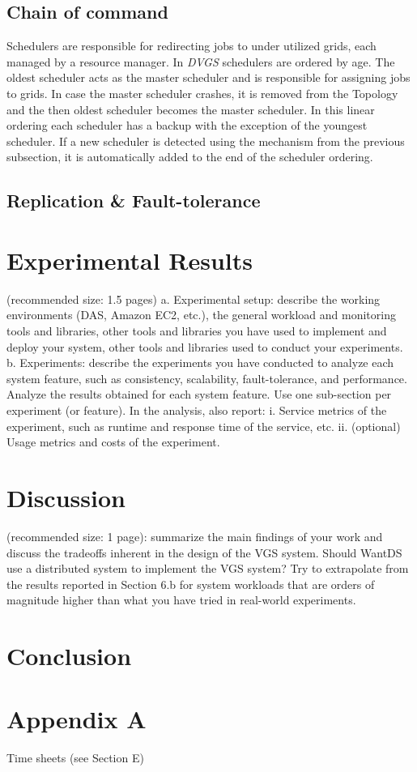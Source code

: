 \documentclass{article}
\begin{document}
\subsection{Chain of command}

Schedulers are responsible for redirecting jobs to under utilized grids, each managed by a resource manager. In \textit{DVGS} schedulers are ordered by age. The oldest scheduler acts as the master scheduler and is responsible for assigning jobs to grids. In case the master scheduler crashes, it is removed from the Topology and the then oldest scheduler becomes the master scheduler. In this linear ordering each scheduler has a backup with the exception of the youngest scheduler. If a new scheduler is detected using the mechanism from the previous subsection, it is automatically added to the end of the scheduler ordering.

\subsection{Replication \& Fault-tolerance}




\section{Experimental Results}
(recommended size: 1.5 pages) 
a. Experimental setup: describe the working environments (DAS, Amazon EC2, 
etc.), the general workload and monitoring tools and libraries, other tools and 
libraries you have used to implement and deploy your system, other tools and 
libraries used to conduct your experiments. 
b. Experiments: describe the experiments you have conducted to analyze each 
system feature, such as consistency, scalability, fault-tolerance, and 
performance. Analyze the results obtained for each system feature. Use one 
sub-section per experiment (or feature). In the analysis, also report: 
i. Service metrics of the experiment, such as runtime and response time of 
the service, etc. 
ii. (optional) Usage metrics and costs of the experiment. 

\section{Discussion}
(recommended size: 1 page): summarize the main findings of your work 
and discuss the tradeoffs inherent in the design of the VGS system. Should WantDS use 
a distributed system to implement the VGS system? Try to extrapolate from the results 
reported in Section 6.b for system workloads that are orders of magnitude higher than 
what you have tried in real-world experiments. 

\section{Conclusion}

\section{Appendix A}
Time sheets (see Section E) 
\end{document}
